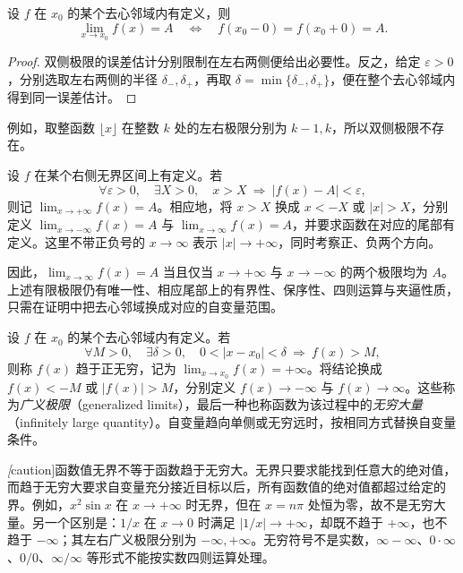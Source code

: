 \documentclass[UTF8,12pt,a4paper,fontset=fandol]{ctexbook}
\begin{document}
\begin{proposition}[双侧极限与单侧极限]
\label{prop:two-sided-and-one-sided-limits}
设 $f$ 在 $x_0$ 的某个去心邻域内有定义，则
\[
    \lim_{x\to x_0}f(x)=A
    \quad\Longleftrightarrow\quad
    f(x_0-0)=f(x_0+0)=A.
\]
\end{proposition}

\begin{proof}
双侧极限的误差估计分别限制在左右两侧便给出必要性。反之，给定 $\varepsilon>0$，分别选取左右两侧的半径 $\delta_-,\delta_+$，再取 $\delta=\min\{\delta_-,\delta_+\}$，便在整个去心邻域内得到同一误差估计。
\end{proof}

例如，取整函数 $\lfloor x\rfloor$ 在整数 $k$ 处的左右极限分别为 $k-1,k$，所以双侧极限不存在。

\begin{definition}
\label{def:function-limits-at-infinity}
设 $f$ 在某个右侧无界区间上有定义。若
\[
    \forall\varepsilon>0,\quad\exists X>0,\quad
    x>X\ \Longrightarrow\ |f(x)-A|<\varepsilon,
\]
则记 $\lim_{x\to+\infty}f(x)=A$。相应地，将 $x>X$ 换成 $x<-X$ 或 $|x|>X$，分别定义 $\lim_{x\to-\infty}f(x)=A$ 与 $\lim_{x\to\infty}f(x)=A$，并要求函数在对应的尾部有定义。这里不带正负号的 $x\to\infty$ 表示 $|x|\to+\infty$，同时考察正、负两个方向。
\end{definition}

因此，$\lim_{x\to\infty}f(x)=A$ 当且仅当 $x\to+\infty$ 与 $x\to-\infty$ 的两个极限均为 $A$。上述有限极限仍有唯一性、相应尾部上的有界性、保序性、四则运算与夹逼性质，只需在证明中把去心邻域换成对应的自变量范围。

\begin{definition}
\label{def:generalized-function-limits}
设 $f$ 在 $x_0$ 的某个去心邻域内有定义。若
\[
    \forall M>0,\quad\exists\delta>0,\quad
    0<|x-x_0|<\delta\ \Longrightarrow\ f(x)>M,
\]
则称 $f(x)$ 趋于正无穷，记为 $\lim_{x\to x_0}f(x)=+\infty$。将结论换成 $f(x)<-M$ 或 $|f(x)|>M$，分别定义 $f(x)\to-\infty$ 与 $f(x)\to\infty$。这些称为\emph{广义极限}（generalized limits），最后一种也称函数为该过程中的\emph{无穷大量}（infinitely large quantity）。自变量趋向单侧或无穷远时，按相同方式替换自变量条件。
\end{definition}

\emph[caution]{函数值无界不等于函数趋于无穷大。}无界只要求能找到任意大的绝对值，而趋于无穷大要求自变量充分接近目标以后，所有函数值的绝对值都超过给定的界。例如，$x^2\sin x$ 在 $x\to+\infty$ 时无界，但在 $x=n\pi$ 处恒为零，故不是无穷大量。另一个区别是：$1/x$ 在 $x\to0$ 时满足 $|1/x|\to+\infty$，却既不趋于 $+\infty$，也不趋于 $-\infty$；其左右广义极限分别为 $-\infty,+\infty$。无穷符号不是实数，$\infty-\infty$、$0\cdot\infty$、$0/0$、$\infty/\infty$ 等形式不能按实数四则运算处理。
\end{document}

